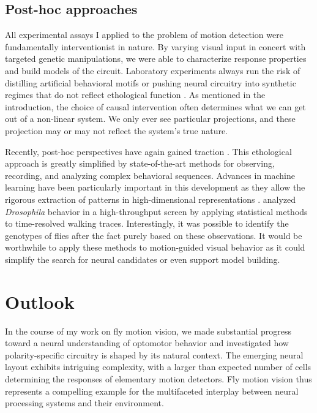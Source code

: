 \subsection{Post-hoc approaches}
All experimental assays I applied to the problem of motion detection were fundamentally interventionist in nature. By varying visual input in concert with targeted genetic manipulations, we were able to characterize response properties and build models of the circuit. Laboratory experiments always run the risk of distilling artificial behavioral motifs or pushing neural circuitry into synthetic regimes that do not reflect ethological function \citep{Krakauer:2017aa}. As mentioned in the introduction, the choice of causal intervention often determines what we can get out of a non-linear system. We only ever see particular projections, and these projection may or may not reflect the system's true nature.

Recently, post-hoc perspectives have again gained traction \citep{GomezMarin:2014aa}. This ethological approach is greatly simplified by state-of-the-art methods for observing, recording, and analyzing complex behavioral sequences. Advances in machine learning have been particularly important in this development as they allow the rigorous extraction of patterns in high-dimensional representations \citep[for instance, see][]{Kabra:2013aa}. \citet{Branson:2009aa} analyzed \textit{Drosophila} behavior in a high-throughput screen by applying statistical methods to time-resolved walking traces. Interestingly, it was possible to identify the genotypes of flies after the fact purely based on these observations. It would be worthwhile to apply these methods to motion-guided visual behavior as it could simplify the search for neural candidates or even support model building.

\section{Outlook}
In the course of my work on fly motion vision, we made substantial progress toward a neural understanding of optomotor behavior and investigated how polarity-specific circuitry is shaped by its natural context. The emerging neural layout exhibits intriguing complexity, with a larger than expected number of cells determining the responses of elementary motion detectors. Fly motion vision thus represents a compelling example for the multifaceted interplay between neural processing systems and their environment.


